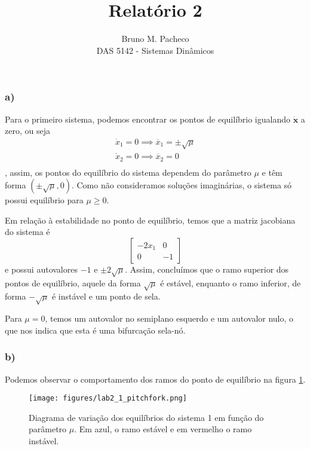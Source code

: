 \documentclass[a4paper]{report}
\begin{document}
 
\title{Relatório 2}
\author{Bruno M. Pacheco\\
DAS 5142 - Sistemas Dinâmicos}
 
\maketitle
 
\exercise{}

\subsubsection*{a)}

Para o primeiro sistema, podemos encontrar os pontos de equilíbrio igualando $\bm{\dot{x}}$ a zero, ou seja
\begin{align*}
    \dot{x}_1 = 0 \implies \overline{x}_1 = \pm\sqrt{\mu} \\
    \dot{x}_2 = 0 \implies \overline{x}_2 = 0 \\
\end{align*}
, assim, os pontos do equilíbrio do sistema dependem do parâmetro $\mu$ e têm forma $(\pm\sqrt{\mu} ,0)$. Como não consideramos soluções imaginárias, o sistema só possui equilíbrio para $\mu\ge 0$.

Em relação à estabilidade no ponto de equilíbrio, temos que a matriz jacobiana do sistema é \[
    \begin{bmatrix} -2x_1 & 0 \\ 0 & -1  \end{bmatrix} 
\] e possui autovalores $-1$ e $\pm 2\sqrt{\mu}$. Assim, concluímos que o ramo superior dos pontos de equilíbrio, aquele da forma $\sqrt{\mu}$ é estável, enquanto o ramo inferior, de forma $-\sqrt{\mu}$ é instável e um ponto de sela.

Para $\mu = 0$, temos um autovalor no semiplano esquerdo e um autovalor nulo, o que nos indica que esta é uma bifurcação sela-nó.

\subsubsection*{b)}

Podemos observar o comportamento dos ramos do ponto de equilíbrio na figura \ref{fig:figures-lab2_1_pitchfork-pdf}.

\begin{figure}[H]
    \centering
    \texttt{[image: figures/lab2\_1\_pitchfork.png]}
    \caption{Diagrama de variação dos equilíbrios do sistema 1 em função do parâmetro $\mu$. Em azul, o ramo estável e em vermelho o ramo instável.}

    \label{fig:figures-lab2_1_pitchfork-pdf}
\end{figure}
\end{document}
